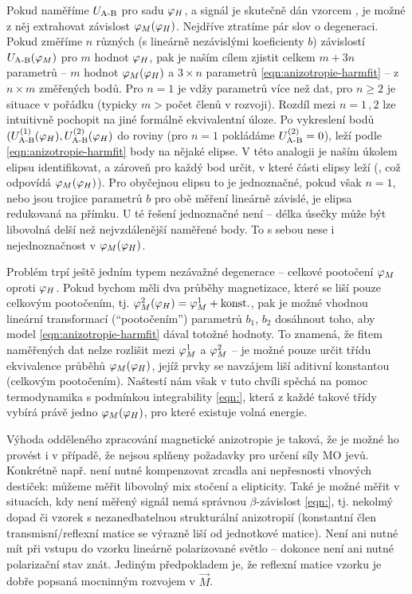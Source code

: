 Pokud naměříme $U_\textrm{A-B}$ pro sadu $\varphi_H$, a signál je skutečně dán vzorcem \label{eqn:anizotropie-harmfit}, je možné z něj extrahovat závislost $\varphi_M(\varphi_H)$.
Nejdříve ztratíme pár slov o degeneraci.
Pokud změříme $n$ různých (s lineárně nezávislými koeficienty $b$) závislostí $U_\textrm{A-B}(\varphi_M)$ pro $m$ hodnot $\varphi_H$, pak je naším cílem zjistit celkem $m+3n$ parametrů -- $m$ hodnot $\varphi_M(\varphi_H)$ a $3\times n$ parametrů \eqref{eqn:anizotropie-harmfit} -- z $n\times m$ změřených bodů.
Pro $n=1$ je vdžy parametrů více než dat, pro $n\geq 2$ je situace v pořádku (typicky $m>$počet členů v rozvoji).
Rozdíl mezi $n=1\,,2$ lze intuitivně pochopit na jiné formálně ekvivalentní úloze.
Po vykreslení bodů $(U_\textrm{A-B}^{(1)}(\varphi_H), U_\textrm{A-B}^{(2)}(\varphi_H)$ do roviny (pro $n=1$ pokládáme $U_\textrm{A-B}^{(2)}=0$), leží podle \eqref{eqn:anizotropie-harmfit} body na nějaké elipse.
V této analogii je naším úkolem elipsu identifikovat, a zároveň pro každý bod určit, v které části elipsy leží (, což odpovídá $\varphi_M(\varphi_H)$).
Pro obyčejnou elipsu to je jednoznačné, pokud však $n=1$, nebo jsou trojice parametrů $b$ pro obě měření lineárně závislé, je elipsa redukovaná na přímku.
U té řešení jednoznačné není -- délka úsečky může být libovolná delší než nejvzdálenější naměřené body.
To s sebou nese i nejednoznačnost v $\varphi_M(\varphi_H)$.

Problém trpí ještě jedním typem nezávažné degenerace -- celkové pootočení $\varphi_M$ oproti $\varphi_H$.
Pokud bychom měli dva průběhy magnetizace, které se liší pouze celkovým pootočením, tj. $\varphi_M^2(\varphi_H)=\varphi_M^1 + \textrm{konst.}$,
pak je možné vhodnou lineární transformací (``pootočením'') parametrů $b_1$, $b_2$ dosáhnout toho, aby model \eqref{eqn:anizotropie-harmfit} dával totožné hodnoty.
To znamená, že fitem naměřených dat nelze rozlišit mezi $\varphi_M^1$ a $\varphi_M^2$ -- je možné pouze určit třídu ekvivalence průběhů $\varphi_M(\varphi_H)$, jejíž prvky se navzájem liší aditivní konstantou (celkovým pootočením).
Naštestí nám však v tuto chvíli spěchá na pomoc termodynamika s podmínkou integrability \eqref{eqn:}, která z každé takové třídy vybírá právě jedno $\varphi_M(\varphi_H)$, pro které existuje volná energie.

Výhoda odděleného zpracování magnetické anizotropie je taková, že je možné ho provést i v případě, že nejsou splňeny požadavky pro určení síly MO jevů.
Konkrétně např. není nutné kompenzovat zrcadla ani nepřesnosti vlnových destiček: můžeme měřit libovolný mix stočení a elipticity.
Také je možné měřit v situacích, kdy není měřený signál nemá správnou $\beta$-závislost \eqref{eqn:}, tj. nekolmý dopad či vzorek s nezanedbatelnou strukturální anizotropií (konstantní člen transmisní/reflexní matice se výrazně liší od jednotkové matice).
Není ani nutné mít při vstupu do vzorku lineárně polarizované světlo -- dokonce není ani nutné polarizační stav znát.
Jediným předpokladem je, že reflexní matice vzorku je dobře popsaná mocninným rozvojem v $\vec{M}$.

